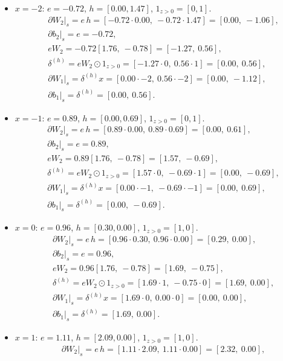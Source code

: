 \documentclass[11pt]{article}
\begin{document}
\begin{itemize}
\item $x=-2$: $e=-0.72$, $h=[0.00, 1.47]$, $1_{z>0}=[0,1]$.
\begin{align*}
&\partial W_2\big|_s = e\,h = [-0.72\cdot0.00,\ -0.72\cdot1.47] = [0.00,\ -1.06],\\
&\partial b_2\big|_s = e = -0.72,\\
&eW_2 = -0.72[1.76,\ -0.78] = [-1.27,\ 0.56],\\
&\delta^{(h)} = eW_2 \odot 1_{z>0} = [-1.27\cdot0,\ 0.56\cdot1] = [0.00,\ 0.56],\\
&\partial W_1\big|_s = \delta^{(h)} x = [0.00\cdot-2,\ 0.56\cdot-2] = [0.00,\ -1.12],\\
&\partial b_1\big|_s = \delta^{(h)} = [0.00,\ 0.56].
\end{align*}
\item $x=-1$: $e=0.89$, $h=[0.00, 0.69]$, $1_{z>0}=[0,1]$.
\begin{align*}
&\partial W_2\big|_s = e\,h = [0.89\cdot0.00,\ 0.89\cdot0.69] = [0.00,\ 0.61],\\
&\partial b_2\big|_s = e = 0.89,\\
&eW_2 = 0.89[1.76,\ -0.78] = [1.57,\ -0.69],\\
&\delta^{(h)} = eW_2 \odot 1_{z>0} = [1.57\cdot0,\ -0.69\cdot1] = [0.00,\ -0.69],\\
&\partial W_1\big|_s = \delta^{(h)} x = [0.00\cdot-1,\ -0.69\cdot-1] = [0.00,\ 0.69],\\
&\partial b_1\big|_s = \delta^{(h)} = [0.00,\ -0.69].
\end{align*}
\item $x=0$: $e=0.96$, $h=[0.30, 0.00]$, $1_{z>0}=[1,0]$.
\begin{align*}
&\partial W_2\big|_s = e\,h = [0.96\cdot0.30,\ 0.96\cdot0.00] = [0.29,\ 0.00],\\
&\partial b_2\big|_s = e = 0.96,\\
&eW_2 = 0.96[1.76,\ -0.78] = [1.69,\ -0.75],\\
&\delta^{(h)} = eW_2 \odot 1_{z>0} = [1.69\cdot1,\ -0.75\cdot0] = [1.69,\ 0.00],\\
&\partial W_1\big|_s = \delta^{(h)} x = [1.69\cdot0,\ 0.00\cdot0] = [0.00,\ 0.00],\\
&\partial b_1\big|_s = \delta^{(h)} = [1.69,\ 0.00].
\end{align*}
\item $x=1$: $e=1.11$, $h=[2.09, 0.00]$, $1_{z>0}=[1,0]$.
\begin{align*}
&\partial W_2\big|_s = e\,h = [1.11\cdot2.09,\ 1.11\cdot0.00] = [2.32,\ 0.00],\\

\end{align*}
\end{itemize}
\end{document}
